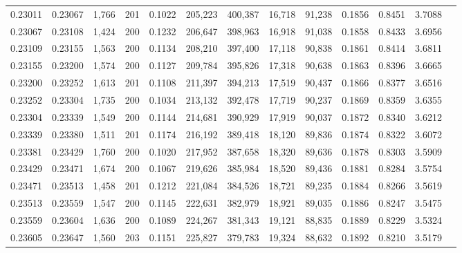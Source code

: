 \begin{tabular}{rrrrrrrrrrrrr}
0.23011 & 0.23067 & 1,766 & 201 &                                     0.1022 & 205,223 & 400,387 &  16,718 &  91,238 & 0.1856 & 0.8451 & 3.7088 \\
0.23067 & 0.23108 & 1,424 & 200 &                                     0.1232 & 206,647 & 398,963 &  16,918 &  91,038 & 0.1858 & 0.8433 & 3.6956 \\
0.23109 & 0.23155 & 1,563 & 200 &                                     0.1134 & 208,210 & 397,400 &  17,118 &  90,838 & 0.1861 & 0.8414 & 3.6811 \\
0.23155 & 0.23200 & 1,574 & 200 &                                     0.1127 & 209,784 & 395,826 &  17,318 &  90,638 & 0.1863 & 0.8396 & 3.6665 \\
0.23200 & 0.23252 & 1,613 & 201 &                                     0.1108 & 211,397 & 394,213 &  17,519 &  90,437 & 0.1866 & 0.8377 & 3.6516 \\
0.23252 & 0.23304 & 1,735 & 200 &                                     0.1034 & 213,132 & 392,478 &  17,719 &  90,237 & 0.1869 & 0.8359 & 3.6355 \\
0.23304 & 0.23339 & 1,549 & 200 &                                     0.1144 & 214,681 & 390,929 &  17,919 &  90,037 & 0.1872 & 0.8340 & 3.6212 \\
0.23339 & 0.23380 & 1,511 & 201 &                                     0.1174 & 216,192 & 389,418 &  18,120 &  89,836 & 0.1874 & 0.8322 & 3.6072 \\
0.23381 & 0.23429 & 1,760 & 200 &                                     0.1020 & 217,952 & 387,658 &  18,320 &  89,636 & 0.1878 & 0.8303 & 3.5909 \\
0.23429 & 0.23471 & 1,674 & 200 &                                     0.1067 & 219,626 & 385,984 &  18,520 &  89,436 & 0.1881 & 0.8284 & 3.5754 \\
0.23471 & 0.23513 & 1,458 & 201 &                                     0.1212 & 221,084 & 384,526 &  18,721 &  89,235 & 0.1884 & 0.8266 & 3.5619 \\
0.23513 & 0.23559 & 1,547 & 200 &                                     0.1145 & 222,631 & 382,979 &  18,921 &  89,035 & 0.1886 & 0.8247 & 3.5475 \\
0.23559 & 0.23604 & 1,636 & 200 &                                     0.1089 & 224,267 & 381,343 &  19,121 &  88,835 & 0.1889 & 0.8229 & 3.5324 \\
0.23605 & 0.23647 & 1,560 & 203 &                                     0.1151 & 225,827 & 379,783 &  19,324 &  88,632 & 0.1892 & 0.8210 & 3.5179 \\

\end{tabular}
